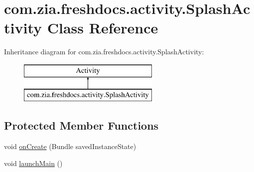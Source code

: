 \hypertarget{classcom_1_1zia_1_1freshdocs_1_1activity_1_1_splash_activity}{\section{com.\-zia.\-freshdocs.\-activity.\-Splash\-Activity Class Reference}
\label{classcom_1_1zia_1_1freshdocs_1_1activity_1_1_splash_activity}
}
Inheritance diagram for com.\-zia.\-freshdocs.\-activity.\-Splash\-Activity\-:\begin{figure}[H]
\begin{center}
\leavevmode
\includegraphics[height=2.000000cm]{classcom_1_1zia_1_1freshdocs_1_1activity_1_1_splash_activity}
\end{center}
\end{figure}
\subsection*{Protected Member Functions}
\begin{DoxyCompactItemize}
\item 
void \hyperlink{classcom_1_1zia_1_1freshdocs_1_1activity_1_1_splash_activity_ac53a314f52bfd14dba138ee7a5bb5e9e}{on\-Create} (Bundle saved\-Instance\-State)
\item 
void \hyperlink{classcom_1_1zia_1_1freshdocs_1_1activity_1_1_splash_activity_aaafe60c35666d2bce50b1e7ae1d417bd}{launch\-Main} ()
\end{DoxyCompactItemize}



